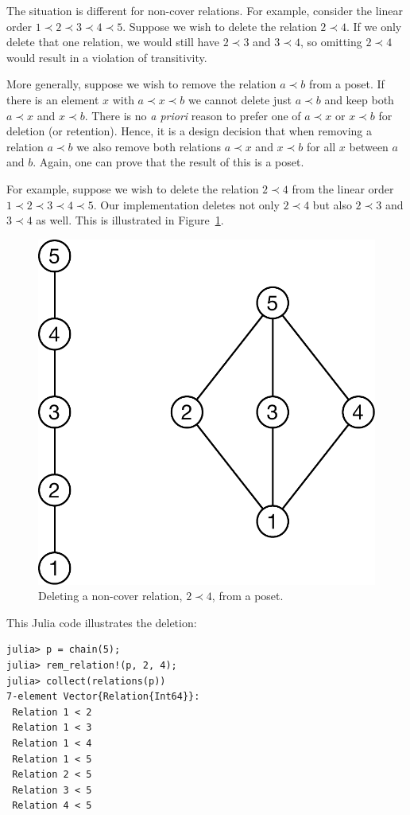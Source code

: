 \documentclass[12pt]{article}
\begin{document}
The situation is different for non-cover relations. For example,
consider the linear order $1\prec2\prec3\prec4\prec5$. Suppose we
wish to delete the relation $2\prec4$. If we only delete that one
relation, we would still have $2\prec3$ and $3\prec4$, so omitting
$2\prec4$ would result in a violation of transitivity. 

More generally, suppose we wish to remove the relation $a\prec b$ from
a poset. If there is an element $x$ with $a\prec x\prec b$ we cannot
delete just $a\prec b$ and keep both $a \prec x$ and $x\prec b$. There
is no \emph{a priori} reason to prefer one of $a\prec x$ or $x \prec
b$ for deletion (or retention). Hence, it is a design decision that
when removing a relation $a \prec b$ we also remove both relations $a
\prec x$ and $x \prec b$ for all $x$ between $a$ and $b$.  Again, one
can prove that the result of this is a poset.

For example, suppose we wish to delete the relation $2\prec4$ from the
linear order $1 \prec 2 \prec 3 \prec 4 \prec 5$. Our implementation
deletes not only $2\prec 4$ but also $2\prec3$ and $3\prec4$ as well. 
This is illustrated in Figure~\ref{fig:other-edge-deletion}. 
\begin{figure}[h]
  \begin{framed}
    \begin{center}
      \includegraphics[scale=0.4]{other-edge-deletion}
    \end{center}
    \caption{Deleting a non-cover relation, $2\prec4$, from a poset. }
    \label{fig:other-edge-deletion}
  \end{framed}
\end{figure}

This Julia code illustrates the deletion:
\begin{verbatim}
julia> p = chain(5);
julia> rem_relation!(p, 2, 4);
julia> collect(relations(p))
7-element Vector{Relation{Int64}}:
 Relation 1 < 2
 Relation 1 < 3
 Relation 1 < 4
 Relation 1 < 5
 Relation 2 < 5
 Relation 3 < 5
 Relation 4 < 5
\end{verbatim}
\end{document}
